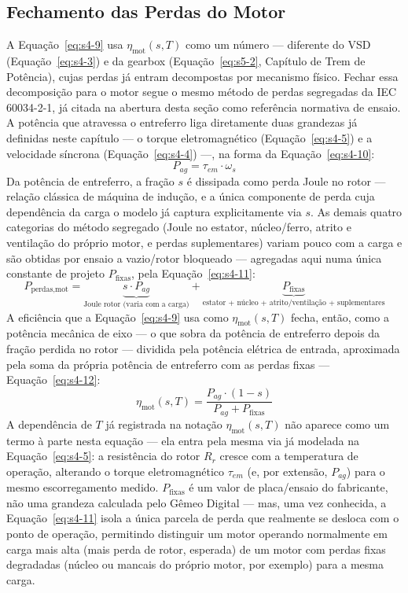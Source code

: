 \documentclass[12pt,a4paper]{article}
\numberwithin{equation}{section}
\numberwithin{table}{section}
\numberwithin{figure}{section}
\begin{document}
{	\subsection{\textbf{Fechamento das Perdas do Motor}}
	A Equação~\eqref{eq:s4-9} usa $\eta_{\text{mot}}(s,T)$ como um número — diferente do VSD (Equação~\eqref{eq:s4-3}) e da gearbox (Equação~\eqref{eq:s5-2}, Capítulo de Trem de Potência), cujas perdas já entram decompostas por mecanismo físico. Fechar essa decomposição para o motor segue o mesmo método de perdas segregadas da IEC 60034-2-1, já citada na abertura desta seção como referência normativa de ensaio. A potência que atravessa o entreferro liga diretamente duas grandezas já definidas neste capítulo — o torque eletromagnético (Equação~\eqref{eq:s4-5}) e a velocidade síncrona (Equação~\eqref{eq:s4-4}) —, na forma da Equação~\eqref{eq:s4-10}:
	\begin{equation}\label{eq:s4-10}
 P_{ag} = \tau_{em} \cdot \omega_s
\end{equation}
	Da potência de entreferro, a fração $s$ é dissipada como perda Joule no rotor — relação clássica de máquina de indução, e a única componente de perda cuja dependência da carga o modelo já captura explicitamente via $s$. As demais quatro categorias do método segregado (Joule no estator, núcleo/ferro, atrito e ventilação do próprio motor, e perdas suplementares) variam pouco com a carga e são obtidas por ensaio a vazio/rotor bloqueado — agregadas aqui numa única constante de projeto $P_{\text{fixas}}$, pela Equação~\eqref{eq:s4-11}:
	\begin{equation}\label{eq:s4-11}
 P_{\text{perdas,mot}} = \underbrace{s \cdot P_{ag}}_{\text{Joule rotor (varia com a carga)}} + \underbrace{P_{\text{fixas}}}_{\text{estator + núcleo + atrito/ventilação + suplementares}}
\end{equation}
	A eficiência que a Equação~\eqref{eq:s4-9} usa como $\eta_{\text{mot}}(s,T)$ fecha, então, como a potência mecânica de eixo — o que sobra da potência de entreferro depois da fração perdida no rotor — dividida pela potência elétrica de entrada, aproximada pela soma da própria potência de entreferro com as perdas fixas — Equação~\eqref{eq:s4-12}:
	\begin{equation}\label{eq:s4-12}
 \eta_{\text{mot}}(s,T) = \frac{P_{ag} \cdot (1-s)}{P_{ag} + P_{\text{fixas}}}
\end{equation}
	A dependência de $T$ já registrada na notação $\eta_{\text{mot}}(s,T)$ não aparece como um termo à parte nesta equação — ela entra pela mesma via já modelada na Equação~\eqref{eq:s4-5}: a resistência do rotor $R_r$ cresce com a temperatura de operação, alterando o torque eletromagnético $\tau_{em}$ (e, por extensão, $P_{ag}$) para o mesmo escorregamento medido. $P_{\text{fixas}}$ é um valor de placa/ensaio do fabricante, não uma grandeza calculada pelo Gêmeo Digital — mas, uma vez conhecida, a Equação~\eqref{eq:s4-11} isola a única parcela de perda que realmente se desloca com o ponto de operação, permitindo distinguir um motor operando normalmente em carga mais alta (mais perda de rotor, esperada) de um motor com perdas fixas degradadas (núcleo ou mancais do próprio motor, por exemplo) para a mesma carga.

}
\end{document}
